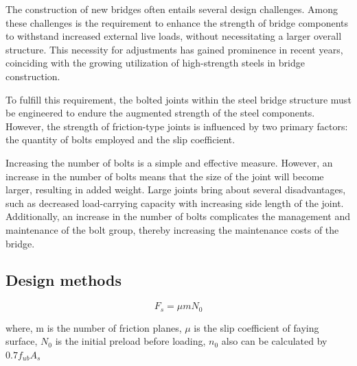 The construction of new bridges often entails several design challenges. Among these challenges is the requirement to enhance the strength of bridge components to withstand increased external live loads, without necessitating a larger overall structure. This necessity for adjustments has gained prominence in recent years, coinciding with the growing utilization of high-strength steels in bridge construction.

To fulfill this requirement, the bolted joints within the steel bridge structure must be engineered to endure the augmented strength of the steel components. However, the strength of friction-type joints is influenced by two primary factors: the quantity of bolts employed and the slip coefficient. 

Increasing the number of bolts is a simple and effective measure. However, an increase in the number of bolts means that the size of the joint will become larger, resulting in added weight. Large joints bring about several disadvantages, such as decreased load-carrying capacity with increasing side length of the joint. Additionally, an increase in the number of bolts complicates the management and maintenance of the bolt group, thereby increasing the maintenance costs of the bridge.

\subsection{Design methods}


\begin{equation} \label{ch2fs}
    F_s=\mu m N_0
\end{equation}

where, m is the number of friction planes, $\mu$ is the slip coefficient of faying surface, $N_0$ is the initial preload before loading, $n_0$ also can be calculated by $0.7f_{ub}A_s$

